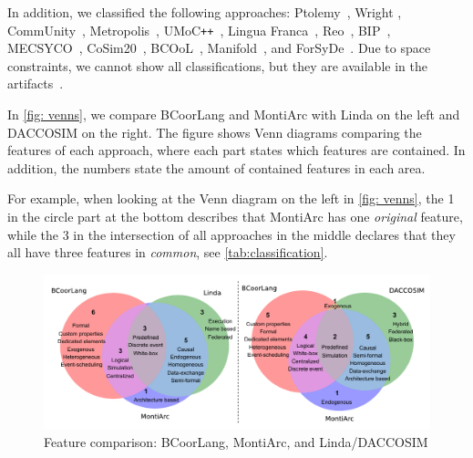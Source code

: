 \documentclass[runningheads]{llncs}
\begin{document}
In addition, we classified the following approaches: Ptolemy~\cite{ekerTamingHeterogeneityPtolemy2003,ptolemaeusSystemDesignModeling2014}, Wright \cite{allenFormalBasisArchitectural1997,allenFormalApproachSoftware1997}, CommUnity~\cite{fiadeiroSemanticsArchitecturalConnectors1997,oliveiraCommUnityWorkbench2007}, Metropolis~\cite{balarinMetropolisIntegratedElectronic2003}, UMoC\texttt{++}~\cite{mathaikuttyUMoCBasedMultiMoC2006}, Lingua Franca~\cite{lohstrohReactorsDeterministicModel2020,lohstrohLinguaFrancaDeterministic2021}, Reo~\cite{arbabReoChannelbasedCoordination2004}, BIP~\cite{bliudzeAlgebraConnectorsStructuring2008,basuRigorousComponentBasedSystem2011},
MECSYCO~\cite{camusCosimulationCyberphysicalSystems2018,camusHybridCosimulationFMUs2016},
CoSim20~\cite{liboniComplexSystemsCosimulation2021},
BCOoL~\cite{varalarsenBehavioralCoordinationOperator2015,varalarsenBCOolBehavioralCoordination2016},
Manifold~\cite{arbabOverviewManifoldIts1993,papadopoulosModellingActivitiesInformation1998}, and ForSyDe~\cite{sanderSystemModelingTransformational2004,sanderForSyDeSystemDesign2016}.
Due to space constraints, we cannot show all classifications, but they are available in the artifacts~\cite{krauterCoordination2024Artifacts2024}.

In \autoref{fig: venns}, we compare BCoorLang and MontiArc with Linda on the left and DACCOSIM on the right.
The figure shows Venn diagrams comparing the features of each approach, where each part states which features are contained.
In addition, the numbers state the amount of contained features in each area.

For example, when looking at the Venn diagram on the left in \autoref{fig: venns}, the \textsf{1} in the circle part at the bottom describes that MontiArc has one \textit{original} feature, while the \textsf{3} in the intersection of all approaches in the middle declares that they all have three features in \textit{common}, see \autoref{tab:classification}.

\begin{figure}[ht]
	\centering
	\includegraphics[width=1\textwidth]{images/venns}
	\caption{Feature comparison: BCoorLang, MontiArc, and Linda/DACCOSIM}
	\label{fig: venns}
\end{figure}
\end{document}
